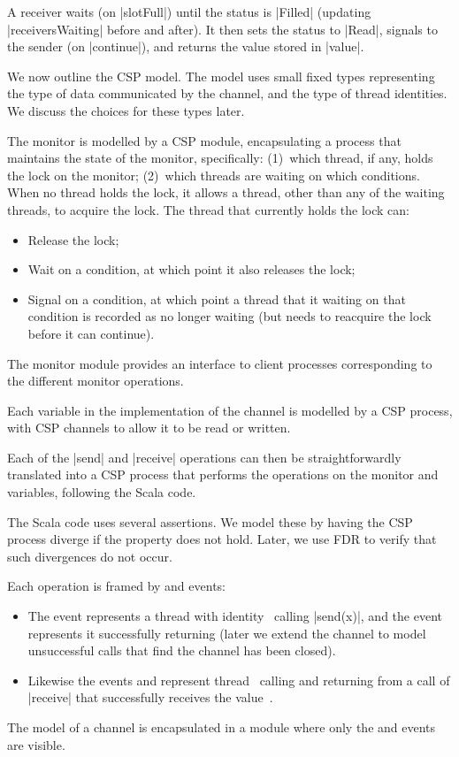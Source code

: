 A receiver waits (on |slotFull|) until the status is |Filled| (updating
|receiversWaiting| before and after).  It then sets the status to |Read|,
signals to the sender (on |continue|), and returns the value stored in
|value|.

We now outline the CSP model.  The model uses small fixed types representing
the type of data communicated by the channel, and the type of thread
identities.  We discuss the choices for these types later. 

The monitor is modelled by a CSP module, encapsulating a process that
maintains the state of the monitor, specifically: (1)~which thread, if any,
holds the lock on the monitor; (2)~which threads are waiting on which
conditions.  When no thread holds the lock, it allows a thread, other than any
of the waiting threads, to acquire the lock.  The thread that currently holds
the lock can:
\begin{itemize}
\item Release the lock;
\item Wait on a condition, at which point it also releases the lock;
\item Signal on a condition, at which point a thread that it waiting on that
  condition is recorded as no longer waiting (but needs to reacquire the lock
  before it can continue).
\end{itemize}
%
The monitor module provides an interface to client processes corresponding to
the different monitor operations.

Each variable in the implementation of the channel is modelled by a CSP
process, with CSP channels to allow it to be read or written.

Each of the |send| and |receive| operations can then be straightforwardly
translated into a CSP process that performs the operations on the monitor and
variables, following the Scala code.  

The Scala code uses several assertions.  We model these by having the CSP
process diverge if the property does not hold.  Later, we use FDR to verify
that such divergences do not occur.  

Each operation is framed by  and  events:
%
\begin{itemize}
\item The event  represents a thread with
  identity~ calling |send(x)|, and the event
   represents it successfully returning (later we
  extend the channel to model unsuccessful calls that find the channel has
  been closed).

\item Likewise the events  and
   represent thread~ calling and
  returning from a call of |receive| that successfully receives the
  value~. 
\end{itemize}
%
The model of a channel is encapsulated in a module where only the 
and  events are visible. 




